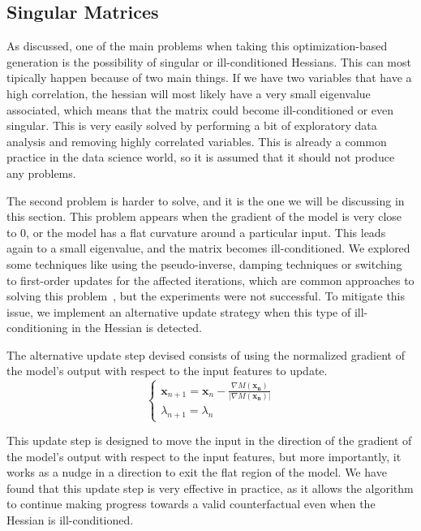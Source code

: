 \documentclass[12pt]{extarticle}
\numberwithin{equation}{section}
\begin{document}
\subsection{Singular Matrices}\label{sec:singular}
As discussed, one of the main problems when taking this optimization-based generation is the possibility of singular or ill-conditioned Hessians. This can most tipically happen because of two main things. If we have two variables that have a high correlation, the hessian  will most likely have a very small eigenvalue associated, which means that the matrix could become ill-conditioned or even singular. This is very easily solved by performing a bit of exploratory data analysis and removing highly correlated variables. This is already a common practice in the data science world, so it is assumed that it should not produce any problems.

The second problem is harder to solve, and it is the one we will be discussing in this section. This problem appears when the gradient of the model is very close to 0, or the model has a flat curvature around a particular input. This leads again to a small eigenvalue, and the matrix becomes ill-conditioned. We explored some techniques like using the pseudo-inverse, damping techniques or switching to first-order updates for the affected iterations, which are common approaches to solving this problem~\cite{numopt}, but the experiments were not successful. To mitigate this issue, we implement an alternative update strategy when this type of ill-conditioning in the Hessian is detected.

The alternative update step devised consists of using the normalized gradient of the model's output with respect to the input features to update. 
\begin{equation}
    \begin{cases}
    \mathbf{x}_{n+1} = \mathbf{x}_n - \frac{\nabla M(\mathbf{x_n})}{|\nabla M(\mathbf{x_n})|}
    \\
    \lambda_{n+1} = \lambda_n
    \end{cases}
\end{equation}

This update step is designed to move the input in the direction of the gradient of the model's output with respect to the input features, but more importantly, it works as a nudge in a direction to exit the flat region of the model. We have found that this update step is very effective in practice, as it allows the algorithm to continue making progress towards a valid counterfactual even when the Hessian is ill-conditioned. 
\end{document}

